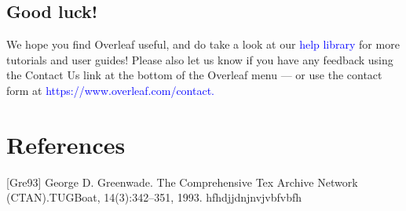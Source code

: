 \documentclass{article}
\begin{document}
\subsection{Good luck!}
We hope you find Overleaf useful, and do take a look at our \textcolor{blue}{help library} for more tutorials and user
guides! Please also let us know if you have any feedback using the Contact Us link at the bottom of
the Overleaf menu — or use the contact form at \textcolor{blue}{https://www.overleaf.com/contact.}
\section*{References}
[Gre93] George D. Greenwade.   The Comprehensive Tex Archive Network (CTAN).TUGBoat,
14(3):342–351, 1993.
hfhdjjdnjnvjvbfvbfh

	
	
\end{document}
